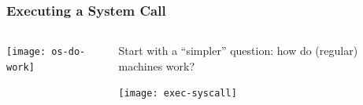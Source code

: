\begin{frame}
	\frametitle{Executing a System Call}
	
	
	
	\begin{columns}
		
		\begin{column}{.3\textwidth}
			
			\texttt{[image: os-do-work]}
			
		\end{column}
		
		\begin{column}{.7\textwidth}
			
			Start with a “simpler” question:  how do (regular) machines work?	
			
			\centering
			\texttt{[image: exec-syscall]}	
			
			
%				
			
		\end{column}
		
		
	\end{columns}
	
	
\end{frame}

